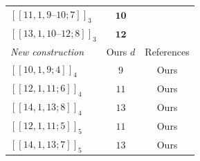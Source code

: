\begin{table}[!ht]
\begin{minipage}[t]{0.485\linewidth}
\begin{tabular}{@{}lcc@{}}
$[[11,1,9\text{--}10;7]]_3$ & $\mathbf{10}$ & \citet{Luo2022} \\
$[[13,1,10\text{--}12;8]]_3$ & $\mathbf{12}$ & \citet{Luo2022} \\
\midrule
\emph{New construction} & Ours $d$ & References \\
\midrule
$[[10,1,9;4]]_4$ & $9$ & Ours \\
$[[12,1,11;6]]_4$ & $11$ & Ours \\
$[[14,1,13;8]]_4$ & $13$ & Ours \\
\midrule
$[[12,1,11;5]]_5$ & $11$ & Ours \\
$[[14,1,13;7]]_5$ & $13$ & Ours \\
\bottomrule
\end{tabular}
\end{minipage}
\end{table}
